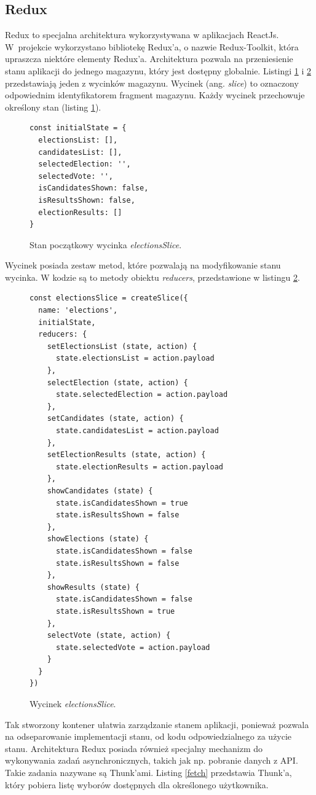 \documentclass[a4paper,12pt]{book}
\begin{document}
\subsection{Redux}

Redux to specjalna architektura wykorzystywana w aplikacjach ReactJs. W~projekcie wykorzystano bibliotekę Redux'a, o nazwie Redux-Toolkit, która upraszcza niektóre elementy Redux'a. Architektura pozwala na przeniesienie stanu aplikacji do jednego magazynu, który jest dostępny globalnie. Listingi \ref{slice} i  \ref{createSlice} przedstawiają jeden z wycinków magazynu. Wycinek (ang. \textit{slice}) to oznaczony odpowiednim identyfikatorem fragment magazynu. Każdy wycinek przechowuje określony stan (listing \ref{slice}).

\begin{figure}[H]
  \centering
\begin{lstlisting}[style=ES6]
const initialState = {
  electionsList: [],
  candidatesList: [],
  selectedElection: '',
  selectedVote: '',
  isCandidatesShown: false,
  isResultsShown: false,
  electionResults: []
}
\end{lstlisting}
\caption{Stan początkowy wycinka \textit{electionsSlice}.}
\label{slice}
\end{figure}
Wycinek posiada zestaw metod, które pozwalają na modyfikowanie stanu wycinka. W kodzie są to metody obiektu \textit{reducers}, przedstawione w listingu \ref{createSlice}.



\begin{figure}[H]
\centering
\begin{lstlisting}[style=ES6]
const electionsSlice = createSlice({
  name: 'elections',
  initialState,
  reducers: {
    setElectionsList (state, action) {
      state.electionsList = action.payload
    },
    selectElection (state, action) {
      state.selectedElection = action.payload
    },
    setCandidates (state, action) {
      state.candidatesList = action.payload
    },
    setElectionResults (state, action) {
      state.electionResults = action.payload
    },
    showCandidates (state) {
      state.isCandidatesShown = true
      state.isResultsShown = false
    },
    showElections (state) {
      state.isCandidatesShown = false
      state.isResultsShown = false
    },
    showResults (state) {
      state.isCandidatesShown = false
      state.isResultsShown = true
    },
    selectVote (state, action) {
      state.selectedVote = action.payload
    }
  }
})
\end{lstlisting}
\caption{Wycinek \textit{electionsSlice}.}
\label{createSlice}
\end{figure}
Tak stworzony kontener ułatwia zarządzanie stanem aplikacji, ponieważ pozwala na odseparowanie implementacji stanu, od kodu odpowiedzialnego za użycie stanu. Architektura Redux posiada również specjalny mechanizm do wykonywania zadań asynchronicznych, takich jak np. pobranie danych z API. Takie zadania nazywane są Thunk'ami. Listing \ref{fetch} przedstawia Thunk'a, który pobiera listę wyborów dostępnych dla określonego użytkownika.
\end{document}
